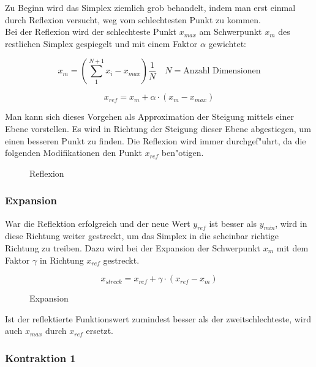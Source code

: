 Zu Beginn wird das Simplex ziemlich grob behandelt, indem man erst einmal durch Reflexion versucht, weg vom schlechtesten Punkt zu kommen.\\
Bei der Reflexion wird der schlechteste Punkt $x_{max}$ am Schwerpunkt $x_m$ des restlichen Simplex gespiegelt und mit einem Faktor $\alpha$ gewichtet:

\begin{equation}
x_m = \left(\sum_1^{N+1} x_i - x_{max}\right) \frac{1}{N} \quad N = \text{Anzahl Dimensionen}
\end{equation}

\begin{equation}
x_{ref} = x_m + \alpha \cdot (x_m-x_{max})
\end{equation}

Man kann sich dieses Vorgehen als Approximation der Steigung mittels einer Ebene vorstellen.
Es wird in Richtung der Steigung dieser Ebene abgestiegen, um einen besseren Punkt zu finden.
Die Reflexion wird immer durchgef"uhrt, da die folgenden Modifikationen den Punkt $x_{ref}$ ben"otigen.

\begin{figure}[h]
	\centering
  	\caption{Reflexion}%
	\label{fig:Reflexion}%
\end{figure}

\subsubsection{Expansion}
War die Reflektion erfolgreich und der neue Wert $y_{ref}$ ist besser als $y_{min}$, wird in diese Richtung weiter gestreckt, um das Simplex in die scheinbar richtige Richtung zu treiben.
Dazu wird bei der Expansion der Schwerpunkt $x_m$ mit dem Faktor $\gamma$ in Richtung $x_{ref}$ gestreckt.

\begin{equation}
x_{streck} = x_{ref} + \gamma \cdot (x_{ref}-x_{m})
\end{equation}
\begin{figure}[h]
	\centering
  	\caption{Expansion}%
	\label{fig:Streckung}%
\end{figure}

Ist der reflektierte Funktionswert zumindest besser als der zweitschlechteste, wird auch $x_{max}$ durch $x_{ref}$ ersetzt.


\subsubsection{Kontraktion 1}


